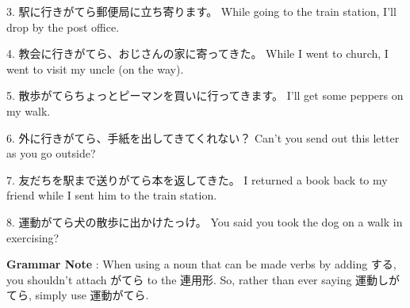 \par{3. 駅に行きがてら郵便局に立ち寄ります。 \hfill\break
While going to the train station, I'll drop by the post office. }
 
\par{4. 教会に行きがてら、おじさんの家に寄ってきた。 \hfill\break
While I went to church, I went to visit my uncle (on the way). }
 
\par{5. 散歩がてらちょっとピーマンを買いに行ってきます。 \hfill\break
I'll get some peppers on my walk. }
 
\par{6. 外に行きがてら、手紙を出してきてくれない？ \hfill\break
Can't you send out this letter as you go outside? }
 
\par{7. 友だちを駅まで送りがてら本を返してきた。 \hfill\break
I returned a book back to my friend while I sent him to the train station. }
 
\par{8. 運動がてら犬の散歩に出かけたっけ。 \hfill\break
You said you took the dog on a walk in exercising? }

\par{\textbf{Grammar Note }: When using a noun that can be made verbs by adding する, you shouldn't attach がてら to the 連用形. So, rather than ever saying 運動しがてら, simply use 運動がてら. }
 
